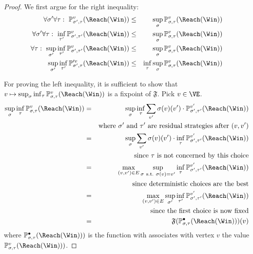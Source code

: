   \begin{proof}
    We first argue for the right inequality:
    \begin{eqnarray*}
      \forall \sigma' \forall \tau:\
      \probm_{\sigma',\tau}^v(\Reach(\Win)) & \le & \sup_\sigma
      \probm_{\sigma,\tau}^v(\Reach(\Win)) \\
      \forall \sigma'\forall \tau :\  \inf_{\tau'}
      \probm_{\sigma',\tau'}^v(\Reach(\Win)) & \le & \sup_\sigma
      \probm_{\sigma,\tau}^v(\Reach(\Win)) \\
      \forall \tau:\ \sup_{\sigma'} \inf_{\tau'}
      \probm_{\sigma',\tau'}^v(\Reach(\Win)) & \le & \sup_\sigma
      \probm_{\sigma,\tau}^v(\Reach(\Win)) \\
      \sup_{\sigma'} \inf_{\tau'}
      \probm_{\sigma',\tau}'^v(\Reach(\Win)) & \le & \inf_{\tau} \sup_\sigma
      \probm_{\sigma,\tau}^v(\Reach(\Win)) 
    \end{eqnarray*}

    For proving the left inequality, it is sufficient to show that
    $v \mapsto \sup_\sigma \inf_\tau
    \probm_{\sigma,\tau}^v(\Reach(\Win))$ is a fixpoint of
    $\mathfrak{F}$.  Pick $v \in \VE$. 
	\begin{eqnarray*}
      \sup_\sigma \inf_\tau \probm_{\sigma,\tau}^v(\Reach(\Win)) & = &
      \sup_\sigma \inf_\tau \sum_{v'} \sigma(v)(v')  \cdot
      \probm_{\sigma',\tau'}^{v'}(\Reach(\Win)) \\
      & & \text{where}\ \sigma'\ \text{and}\ \tau'\ \text{are residual strategies after}\ (v,v') \\
      & = & \sup_\sigma \sum_{v'} \sigma(v)(v')  \cdot \inf_\tau \probm_{\sigma',\tau'}^{v'}(\Reach(\Win)) \\
      & & \text{since}\ \tau\ \text{is not concerned by this choice}
      \\
      & = & \max_{(v,v') \in E} \sup_{\sigma\ \text{s.t.}\
        \sigma(v) = v'} \inf_\tau
      \probm_{\sigma',\tau'}^{v'}(\Reach(\Win)) \\
      & & \text{since deterministic choices are the best} \\
      & = & \max_{(v,v') \in E} \sup_{\sigma'} \inf_{\tau'}
      \probm_{\sigma',\tau'}^{v'}(\Reach(\Win)) \\
      & & \text{since the first choice is now fixed} \\
      & = & \mathfrak{F}(\probm_{\sigma,\tau}^{\bullet}(\Reach(\Win)))(v)
    \end{eqnarray*}
    where $\probm_{\sigma,\tau}^{\bullet}(\Reach(\Win)))$ is the
    function with associates with vertex $v$ the value
    $\probm_{\sigma,\tau}^{v}(\Reach(\Win)))$.


\end{proof}
